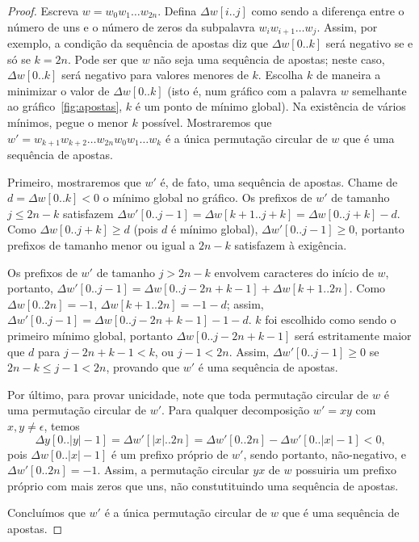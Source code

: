 \begin{proof}
    Escreva $w = w_0 w_1 \dots w_{2n}$.
    Defina $\Delta w[i..j]$ como sendo a diferença entre
    o número de uns e o número de zeros
    da subpalavra $w_i w_{i+1} \dots w_j$.
    Assim,
    por exemplo,
    a condição da sequência de apostas
    diz que $\Delta w[0..k]$ será negativo
    se e só se $k = 2n$.
    Pode ser que $w$ não seja uma sequência de apostas;
    neste caso, $\Delta w[0..k]$ será negativo
    para valores menores de $k$.
    Escolha $k$ de maneira a minimizar o valor de $\Delta w[0..k]$
    (isto é, num gráfico com a palavra $w$ semelhante ao gráfico~\ref{fig:apostas},
    $k$ é um ponto de mínimo global).
    Na existência de vários mínimos,
    pegue o menor $k$ possível.
    Mostraremos que $w' = w_{k+1} w_{k+2} \dots w_{2n} w_0 w_1 \dots w_k$
    é a única permutação circular de $w$
    que é uma sequência de apostas.

    Primeiro,
    mostraremos que $w'$ é,
    de fato,
    uma sequência de apostas.
    Chame de $d = \Delta w[0..k] < 0$ o mínimo global no gráfico.
    Os prefixos de $w'$ de tamanho $j \leq 2n-k$ satisfazem
    $\Delta w'[0..j-1] = \Delta w[k+1..j+k] = \Delta w[0..j+k] - d$.
    Como $\Delta w[0..j+k] \geq d$
    (pois $d$ é mínimo global),
    $\Delta w'[0..j-1] \geq 0$,
    portanto prefixos de tamanho menor ou igual a $2n - k$
    satisfazem à exigência.

    Os prefixos de $w'$ de tamanho $j > 2n - k$
    envolvem caracteres do início de $w$,
    portanto, $\Delta w'[0..j-1] = \Delta w[0..j-2n+k-1] + \Delta w[k+1..2n]$.
    Como $\Delta w[0..2n] = -1$,
    $\Delta w[k+1..2n] = -1-d$;
    assim, $\Delta w'[0..j-1] = \Delta w[0..j-2n+k-1] - 1 - d$.
    $k$ foi escolhido como sendo o primeiro mínimo global,
    portanto $\Delta w[0..j-2n+k-1]$ será estritamente maior que $d$
    para $j - 2n + k - 1 < k$, ou $j-1 < 2n$.
    Assim,
    $\Delta w'[0..j-1] \geq 0$
    se $2n - k \leq j-1 < 2n$,
    provando que $w'$ é uma sequência de apostas.

    Por último, para provar unicidade,
    note que toda permutação circular de $w$ é uma permutação circular de $w'$.
    Para qualquer decomposição $w' = xy$ com $x, y \neq \epsilon$,
    temos
    \begin{equation*}
        \Delta y[0..|y|-1] = \Delta w'[|x|..2n] = \Delta w'[0..2n] - \Delta w'[0..|x|-1]
        < 0,
    \end{equation*}
    pois $\Delta w[0..|x|-1]$ é um prefixo próprio de $w'$,
    sendo portanto, não-negativo,
    e $\Delta w'[0..2n] = -1$.
    Assim, a permutação circular $yx$ de $w$
    possuiria um prefixo próprio com mais zeros que uns,
    não constutituindo uma sequência de apostas.

    Concluímos que $w'$ é a única permutação circular de $w$
    que é uma sequência de apostas.
\end{proof}

